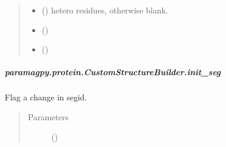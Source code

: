\documentclass[a4paper,10pt,english]{sphinxmanual}
\begin{document}
\begin{fulllineitems}
\begin{fulllineitems}
\begin{fulllineitems}
\begin{quote}
\begin{description}
\begin{itemize}
\item {} 
\sphinxstyleliteralstrong{\sphinxupquote{, }}\sphinxstyleliteralstrong{\sphinxupquote{, }} (\sphinxstyleliteralemphasis{\sphinxupquote{-}}) \textendash{} hetero residues, otherwise blank.

\item {} 
\sphinxstyleliteralstrong{\sphinxupquote{, }} (\sphinxstyleliteralemphasis{\sphinxupquote{-}}) \textendash{} 

\item {} 
\sphinxstyleliteralstrong{\sphinxupquote{, }} (\sphinxstyleliteralemphasis{\sphinxupquote{-}}) \textendash{} 

\end{itemize}

\end{description}\end{quote}

\end{fulllineitems}



\subparagraph{paramagpy.protein.CustomStructureBuilder.init\_seg}
\label{\detokenize{reference/generated/paramagpy.protein.CustomStructureBuilder.init_seg:paramagpy-protein-customstructurebuilder-init-seg}}\label{\detokenize{reference/generated/paramagpy.protein.CustomStructureBuilder.init_seg::doc}}

\begin{fulllineitems}
\label{\detokenize{reference/generated/paramagpy.protein.CustomStructureBuilder.init_seg:paramagpy.protein.CustomStructureBuilder.init_seg}}
Flag a change in segid.
\begin{quote}\begin{description}
\item[{Parameters}] \leavevmode
{} (\sphinxstyleliteralemphasis{\sphinxupquote{-}}) \textendash{} 


\end{description}
\end{quote}
\end{fulllineitems}
\end{fulllineitems}
\end{fulllineitems}
\end{document}
